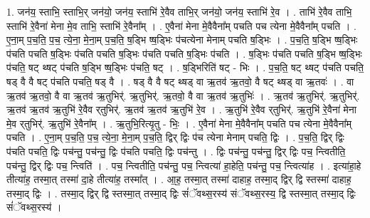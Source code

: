 \documentclass[17pt]{extarticle}
\begin{document}
1. जन॑य॒ स्ताभि॒ स्ताभि॒र् जन॑यो॒ जन॑य॒ स्ताभि॑ रे॒वैव ताभि॒र् जन॑यो॒ जन॑य॒ स्ताभि॑ रे॒व । . ताभि॑ रे॒वैव ताभि॒ स्ताभि॑ रे॒वैना॑ मेना मे॒व ताभि॒ स्ताभि॑ रे॒वैना᳚म् । . ए॒वैना॑ मेना मे॒वैवैना᳚म् पचति पच त्येना मे॒वैवैना᳚म् पचति । . ए॒ना॒म् प॒च॒ति॒ प॒च॒ त्ये॒ना॒ मे॒ना॒म् प॒च॒ति॒ ष॒ड्भि ष्ष॒ड्भिः प॑चत्येना मेनाम् पचति ष॒ड्भिः । . प॒च॒ति॒ ष॒ड्भि ष्ष॒ड्भिः प॑चति पचति ष॒ड्भिः प॑चति पचति ष॒ड्भिः प॑चति पचति ष॒ड्भिः प॑चति । . ष॒ड्भिः प॑चति पचति ष॒ड्भि ष्ष॒ड्भिः प॑चति॒ षट् थ्षट् प॑चति ष॒ड्भि ष्ष॒ड्भिः प॑चति॒ षट् । . ष॒ड्भिरिति॑ षट् - भिः । . प॒च॒ति॒ षट् थ्षट् प॑चति पचति॒ षड् वै वै षट् प॑चति पचति॒ षड् वै । . षड् वै वै षट् थ्षड् वा ऋ॒तव॑ ऋ॒तवो॒ वै षट् थ्षड् वा ऋ॒तवः॑ । . वा ऋ॒तव॑ ऋ॒तवो॒ वै वा ऋ॒तव॑ ऋ॒तुभिर्॑. ऋ॒तुभिर्॑. ऋ॒तवो॒ वै वा ऋ॒तव॑ ऋ॒तुभिः॑ । . ऋ॒तव॑ ऋ॒तुभिर्॑. ऋ॒तुभिर्॑. ऋ॒तव॑ ऋ॒तव॑ ऋ॒तुभि॑ रे॒वैव र्‌तुभिर्॑. ऋ॒तव॑ ऋ॒तव॑ ऋ॒तुभि॑ रे॒व । . ऋ॒तुभि॑ रे॒वैव र्‌तुभिर्॑. ऋ॒तुभि॑ रे॒वैना॑ मेना मे॒व र्‌तुभिर्॑. ऋ॒तुभि॑ रे॒वैना᳚म् । . ऋ॒तुभि॒रित्यृ॒तु - भिः॒ । . ए॒वैना॑ मेना मे॒वैवैना᳚म् पचति पच त्येना मे॒वैवैना᳚म् पचति । . ए॒ना॒म् प॒च॒ति॒ प॒च॒ त्ये॒ना॒ मे॒ना॒म् प॒च॒ति॒ द्विर् द्विः प॑च त्येना मेनाम् पचति॒ द्विः । . प॒च॒ति॒ द्विर् द्विः प॑चति पचति॒ द्विः पच॑न्तु॒ पच॑न्तु॒ द्विः प॑चति पचति॒ द्विः पच॑न्तु । . द्विः पच॑न्तु॒ पच॑न्तु॒ द्विर् द्विः पच॒ न्त्वितीति॒ पच॑न्तु॒ द्विर् द्विः पच॒ न्त्विति॑ । . पच॒ न्त्वितीति॒ पच॑न्तु॒ पच॒ न्त्वित्या॑ हा॒हेति॒ पच॑न्तु॒ पच॒ न्त्वित्या॑ह । . इत्या॑हा॒हे तीत्या॑ह॒ तस्मा॒त् तस्मा॑ दा॒हे तीत्या॑ह॒ तस्मा᳚त् । . आ॒ह॒ तस्मा॒त् तस्मा॑ दाहाह॒ तस्मा॒द् द्विर् द्वि स्तस्मा॑ दाहाह॒ तस्मा॒द् द्विः । . तस्मा॒द् द्विर् द्वि स्तस्मा॒त् तस्मा॒द् द्विः सं॑ॅवथ्स॒रस्य॑ संॅवथ्स॒रस्य॒ द्वि स्तस्मा॒त् तस्मा॒द् द्विः सं॑ॅवथ्स॒रस्य॑ । \newline
\end{document}
